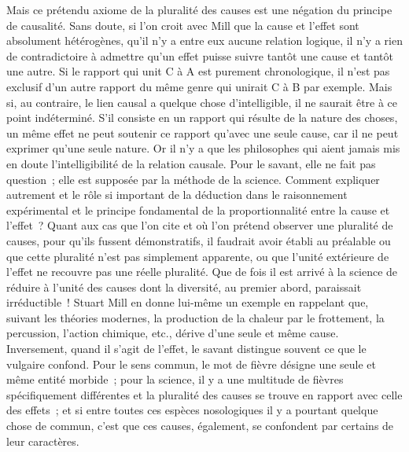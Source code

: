 \documentclass[french,twoside]{book} %
\begin{document}
Mais ce prétendu axiome de la pluralité des causes est une négation du principe de causalité. Sans doute, si l’on croit avec Mill que la cause et l’effet sont absolument hétérogènes, qu’il n’y a entre eux aucune relation logique, il n’y a rien de contradictoire à admettre qu’un effet puisse suivre tantôt une cause et tantôt une autre. Si le rapport qui unit C à A est purement chronologique, il n’est pas exclusif d’un autre rapport du même genre qui unirait C à B par exemple. Mais si, au contraire, le lien causal a quelque chose d’intelligible, il ne saurait être à ce point indéterminé. S’il consiste en un rapport qui résulte de la nature des choses, un même effet ne peut soutenir ce rapport qu’avec une seule cause, car il ne peut exprimer qu’une seule nature. Or il n’y a que les philosophes qui aient jamais mis en doute l’intelligibilité de la relation causale. Pour le savant, elle ne fait pas question ; elle est supposée par la méthode de la science. Comment expliquer autrement et le rôle si important de la déduction dans le raisonnement expérimental et le principe fondamental de la proportionnalité entre la cause et l’effet ? Quant aux cas que l’on cite et où l’on prétend observer une pluralité de causes, pour qu’ils fussent démonstratifs, il faudrait avoir établi au préalable ou que cette pluralité n’est pas simplement apparente, ou que l’unité extérieure de l’effet ne recouvre pas une réelle pluralité. Que de fois il est arrivé à la science de réduire à l’unité des causes dont la diversité, au premier abord, paraissait irréductible ! Stuart Mill en donne lui-même un exemple en rappelant que, suivant les théories modernes, la production de la chaleur par le frottement, la percussion, l’action chimique, etc., dérive d’une seule et même cause. Inversement, quand il s’agit de l’effet, le savant distingue souvent ce que le vulgaire confond. Pour le sens commun, le mot de fièvre désigne une seule et même entité morbide ; pour la science, il y a une multitude de fièvres spécifiquement différentes et la pluralité des causes se trouve en rapport avec celle des effets ; et si entre toutes ces espèces nosologiques il y a pourtant quelque chose de commun, c’est que ces causes, également, se confondent par certains de leur caractères.\par
\end{document}
